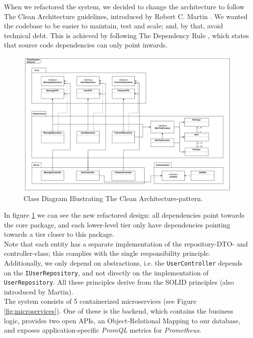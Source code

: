 When we refactored the system, we decided to change the architecture to follow The Clean Architecture guidelines, introduced by Robert C. Martin \cite{clean}. We wanted the codebase to be easier to maintain, test and scale; and, by that, avoid technical debt.
This is achieved by following The Dependency Rule \cite{clean}, which states that source code dependencies can only point inwards.

\begin{figure}[H]
    \centering
    \includegraphics[scale=0.088]{images/package_class-diagrams/class_diagram_backend.png}
    \caption{Class Diagram Illustrating The Clean Architecture-pattern.}
    \label{fig:diagramClass}
\end{figure}

In figure \ref{fig:diagramClass} we can see the new refactored design: all dependencies point towards the core package, and each lower-level tier only have dependencies pointing towards a tier closer to this package. \\
Note that each entity has a separate implementation of the repository-DTO- and controller-class; this complies with the single responsibility principle. Additionally, we only depend on abstractions, i.e. the \texttt{UserController} depends on the \texttt{IUserRepository}, and not directly on the implementation of \texttt{UserRepository}. All these principles derive from the SOLID principles (also introduced by Martin).\\

The system consists of 5 containerized microservices (see Figure \ref{fig:microservices}).
One of these is the backend, which contains the business logic, provides two open APIs, an Object-Relational Mapping to our database, and exposes application-specific \textit{PromQL} metrics for \textit{Prometheus}. \par

